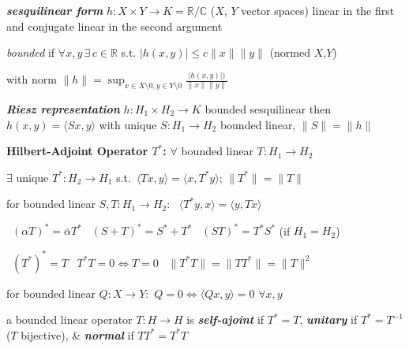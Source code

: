 \documentclass[8pt,twoside]{extarticle}
\begin{document}
\begin{multicols}{2}
\textbf{\textit{sesquilinear form}} $h:X\times Y\to K=\mathbb{R}/\mathbb{C}$ ($X$, $Y$ vector spaces) linear in the first and conjugate linear in the second argument

\textit{bounded} if $\forall x,y \,\exists\, c{\in}\mathbb{R}$ s.t. $|h(x,y)|\leq c\|x\|\|y\|$  (normed $X$,$Y$)

with norm $\|h\|{=}\sup_{x\in X\setminus 0, y\in Y\setminus 0}\frac{|h(x,y)|)}{\|x\|\|y\|}$

 \textit{\textbf{Riesz representation}} $h{:}H_1{\times} H_2{\to} K$ bounded sesquilinear then $h(x,y){=}\langle Sx,y\rangle$ with unique $S{:}H_1{\to} H_2$ bounded linear, $\|S\|{=}\|h\|$


\textbf{Hilbert-Adjoint Operator $T^*$:} $\forall$ bounded linear $T{:}H_1{\to}H_2$

 $\exists$ unique $T^*{:}H_2{\to}H_1$ s.t.\ $\langle Tx,y\rangle{=}\langle x,T^*y\rangle$; $\|T^*\|{=}\|T\|$
 
 for bounded linear $S,T{:}H_1{\to}H_2$: \hspace{1.45em}   
 \textbullet\ $\langle T^*y,x\rangle=\langle y,Tx\rangle$ 
 
\textbullet\ $(\alpha T)^*=\bar{\alpha}T^*$   \hfill 
\textbullet\ $(S{+}T)^*=S^*{+}T^*$ \hfill
\textbullet\ $(ST)^*{=}T^*S^*$ (if $H_1{=}H_2$)  
 
\textbullet\ $(T^*)^*=T$ \hspace{1.2em}
\textbullet\ $T^*T{=}0\Leftrightarrow T{=}0$ \hspace{1.06em} 
\textbullet\ $\|T^*T\|=\|TT^*\|=\|T\|^2$ 
 
 for bounded linear $Q: X{\to}Y$: $\,Q{=}0\Leftrightarrow\langle Qx,y\rangle{=}0 \,\,\forall x,y$
 
a bounded linear operator $T{:}H{\to} H$ is \textit{\textbf{self-ajoint}} if $T^*{=}T$, \textit{\textbf{unitary}} if  $T^*{=}T^{-1} $ ($T$ bijective), \& \textit{\textbf{normal}} if $TT^*{=}T^*T$






\end{multicols}









\end{document}

